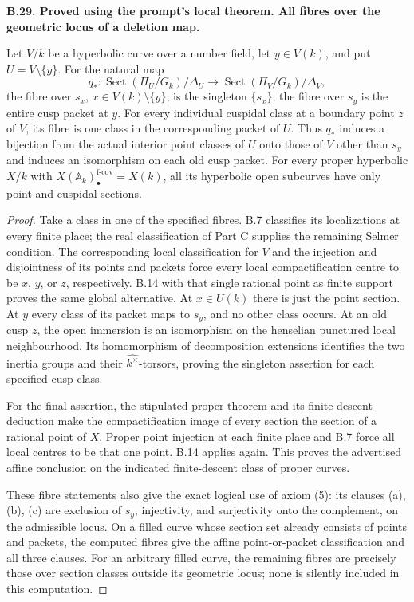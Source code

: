 \documentclass[11pt,oneside]{article}
\makeatletter
\newcounter{statementanchor}
\newenvironment{statement}[3]{%
 \refstepcounter{statementanchor}\def\@currentlabel{#1}%
 \par\addvspace{9pt}\noindent
 \textbf{#1. #2. #3.}\par\nobreak\noindent\ignorespaces
}{\par\addvspace{5pt}}
\makeatother
\begin{document}
\begin{statement}{B.29}{Proved using the prompt's local theorem}{All fibres over the geometric locus of a deletion map}
\label{st:B.29}

Let $V/k$ be a hyperbolic curve over a number field, let $y\in V(k)$,
and put $U=V\setminus\{y\}$.  For the natural map
\[
 q_*:\operatorname{Sect}(\Pi_U/G_k)/\Delta_U
       \longrightarrow\operatorname{Sect}(\Pi_V/G_k)/\Delta_V,
\]
the fibre over $s_x$, $x\in V(k)\setminus\{y\}$, is the singleton
$\{s_x\}$; the fibre over $s_y$ is the entire cusp packet at $y$.
For every individual cuspidal class at a boundary point $z$ of $V$,
its fibre is one class in the corresponding packet of $U$.
Thus $q_*$ induces a bijection from the actual interior point
classes of $U$ onto those of $V$ other than $s_y$ and induces an
isomorphism on each old cusp packet.
For every proper hyperbolic $X/k$ with
$X(\mathbb A_k)_\bullet^{\mathrm{f\text{-}cov}}=X(k)$, all its
hyperbolic open subcurves have only point and cuspidal sections.
\end{statement}
\begin{proof}
Take a class in one of the specified fibres.  B.7 classifies its
localizations at every finite place; the real classification of
Part C supplies the remaining Selmer condition.  The corresponding local
classification for $V$ and the injection and disjointness of its
points and packets force every local compactification centre to
be $x$, $y$, or $z$, respectively.  B.14 with that single rational
point as finite support proves the same global alternative.
At $x\in U(k)$ there is just the point section.  At $y$ every
class of its packet maps to $s_y$, and no other class occurs.
At an old cusp $z$, the open immersion is an isomorphism on the
henselian punctured local neighbourhood.  Its homomorphism of
decomposition extensions identifies the two inertia groups and
their $\widehat{k^\times}$-torsors, proving the singleton assertion
for each specified cusp class.

For the final assertion, the stipulated proper theorem and its
finite-descent deduction make the compactification image of every
section the section of a rational point of $X$.  Proper point
injection at each finite place and B.7 force all local centres to
be that one point.  B.14 applies again.  This proves the advertised
affine conclusion on the indicated finite-descent class of proper
curves.

These fibre statements also give the exact logical use of axiom
(5): its clauses (a), (b), (c) are exclusion of $s_y$, injectivity,
and surjectivity onto the complement, on the admissible locus.
On a filled curve whose section set already consists of points
and packets, the computed fibres give the affine point-or-packet
classification and all three clauses.  For an arbitrary filled
curve, the remaining fibres are precisely those over section
classes outside its geometric locus; none is silently included
in this computation.
\end{proof}
\end{document}

